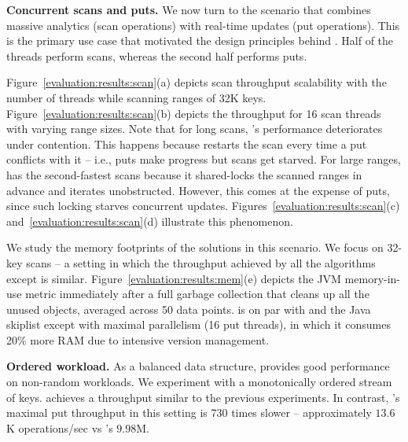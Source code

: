 \textbf{Concurrent scans and puts.}
We now turn to the scenario that combines massive analytics (scan operations) with 
real-time updates (put operations). This is the primary use case that motivated 
the design principles behind {\kiwi}. Half of the threads perform scans, whereas 
the second half performs puts. 

Figure~\ref{evaluation:results:scan}(a) depicts scan throughput scalability with the number of threads
while scanning ranges of 32K keys. Figure~\ref{evaluation:results:scan}(b) depicts the throughput for 16 scan 
threads with varying range sizes. Note that for long scans, {\kary}'s performance deteriorates under contention. 
This happens because {\kary} restarts the scan every time a put conflicts with it -- i.e., puts make progress 
but scans get starved. For large ranges, {\snaptree} has the second-fastest scans because it shared-locks 
the scanned ranges in advance and iterates unobstructed. However, this comes at the expense of puts, 
since such locking starves concurrent updates. Figures~\ref{evaluation:results:scan}(c) 
and~\ref{evaluation:results:scan}(d) illustrate this phenomenon. 

We study the memory footprints of the solutions in this scenario. We focus on 32-key scans -- a setting 
in which the throughput achieved by all the algorithms except {\snaptree} is similar.  
Figure~\ref{evaluation:results:mem}(e) depicts the JVM memory-in-use metric immediately after a full 
garbage collection that cleans up all the unused objects, averaged across 50 data points. 
{\kiwi} is on par with {\kary} and the Java skiplist except with maximal parallelism (16 put threads), 
in which it consumes 20\% more RAM due to intensive version management.  


\textbf{Ordered workload.} 
As a balanced data structure, {\kiwi} provides good performance on non-random workloads. 
We experiment with a monotonically ordered stream of keys. {\kiwi} achieves a throughput 
similar to the previous experiments. In contrast, {\kary}'s maximal put throughput in this setting is 
730 times slower -- approximately $13.6$K operations/sec vs {\kiwi}'s $9.98$M. 
